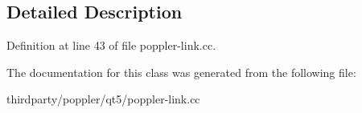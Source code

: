\subsection{Detailed Description}


Definition at line 43 of file poppler-\/link.\+cc.



The documentation for this class was generated from the following file\+:\begin{DoxyCompactItemize}
\item 
thirdparty/poppler/qt5/poppler-\/link.\+cc\end{DoxyCompactItemize}

